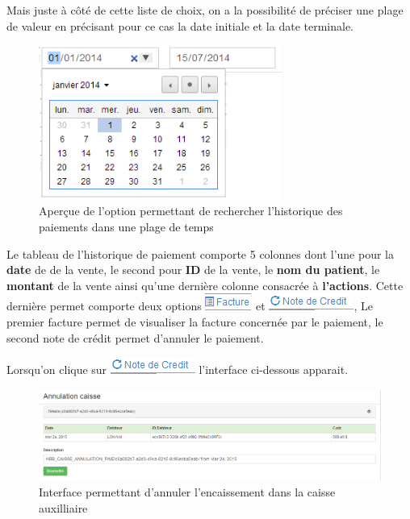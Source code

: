 \documentclass[12pt,a4paper]{report}
\begin{document}
Mais juste à côté de cette liste de choix, on a la possibilité de préciser une plage de valeur en précisant pour ce cas la date initiale et la date terminale.

\begin{figure}[h]
\begin{center}
\includegraphics[width=8cm]{pic/SelectPlageValeur.png}
\end{center}
\caption{Aperçue de l'option permettant de rechercher l'historique des paiements dans une plage de temps}
\label{Aperçue de l'option permettant de rechercher l'historique des paiement dans une plage de temps}
\end{figure}

Le tableau de l'historique de paiement comporte 5 colonnes dont l'une pour la\textbf{ date} de de la vente, le second pour \textbf{ID }de la vente, le \textbf{nom du patient}, le \textbf{montant} de la vente ainsi qu'une dernière colonne consacrée à \textbf{l'actions}. Cette dernière permet comporte deux options \includegraphics[scale=0.7]{pic/FactureF.png}  et \includegraphics[scale=0.7]{pic/NoteCredit.png}, Le premier facture permet de visualiser la facture concernée par le paiement, le second note de crédit permet d'annuler le paiement. 

Lorsqu'on clique sur \includegraphics[scale=0.7]{pic/NoteCredit.png}  l'interface ci-dessous apparait.

\begin{figure}[h]
\begin{center}
\includegraphics[width=14cm]{pic/AnnulationCaisseAux.png}
\end{center}
\caption{Interface permettant d'annuler l'encaissement dans la caisse auxilliaire}
\label{Interface permettant d'annuler l'encaissement dans la caisse auxilliaire}
\end{figure}
\end{document}
